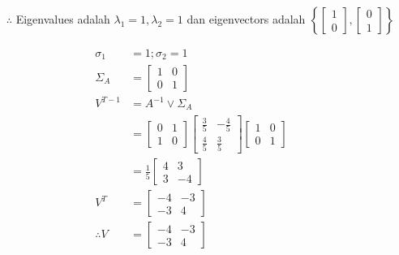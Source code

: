 \documentclass[12pt, a4paper]{scrartcl}
\begin{document}
\begin{enumerate}
\begin{enumerate}
\begin{itemize}
                    \item[$\therefore$] Eigenvalues adalah $\lambda_1=1, \lambda_2=1$ dan eigenvectors adalah $\left\{\begin{bmatrix}
                        1\\0
                    \end{bmatrix},\begin{bmatrix}
                        0\\1
                    \end{bmatrix}\right\}$ 
                \end{itemize}
                \begin{align*}
                    \sigma_1&=1; \sigma_2=1
                    \\ \Sigma_A&=\begin{bmatrix}
                        1&0\\0&1
                    \end{bmatrix}
                    \\V^{T-1}&=A^{-1}\lor\Sigma_A
                    \\ &= \begin{bmatrix}
                        0&1\\1&0
                    \end{bmatrix}\begin{bmatrix}
                        \frac{3}{5}&-\frac{4}{5}\\\frac{4}{5}&\frac{3}{5}
                    \end{bmatrix}\begin{bmatrix}
                        1&0\\0&1
                    \end{bmatrix}
                    \\ &= \frac{1}{5}\begin{bmatrix}
                        4&3\\3&-4
                    \end{bmatrix}
                    \\ V^T&=\begin{bmatrix}
                        -4&-3\\-3&4
                    \end{bmatrix}
                    \\ \therefore V &= \begin{bmatrix}
                        -4&-3\\-3&4
                    \end{bmatrix}
                \end{align*}


\end{enumerate}
\end{enumerate}
\end{document}
